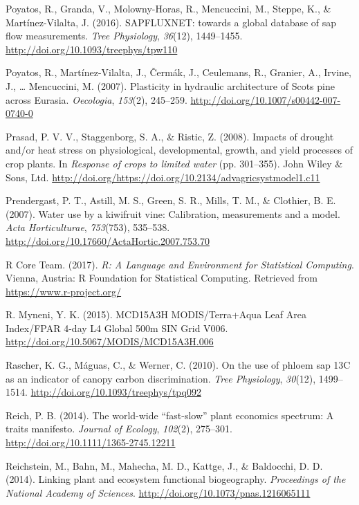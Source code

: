 \documentclass[11pt,twoside]{reedthesis}
\begin{document}
\hypertarget{ref-Poyatos2016}{}
Poyatos, R., Granda, V., Molowny-Horas, R., Mencuccini, M., Steppe, K.,
\& Martínez-Vilalta, J. (2016). SAPFLUXNET: towards a global database of
sap flow measurements. \emph{Tree Physiology}, \emph{36}(12),
1449--1455. \url{http://doi.org/10.1093/treephys/tpw110}

\hypertarget{ref-Poyatos2007}{}
Poyatos, R., Martínez-Vilalta, J., Čermák, J., Ceulemans, R., Granier,
A., Irvine, J., \ldots{} Mencuccini, M. (2007). Plasticity in hydraulic
architecture of Scots pine across Eurasia. \emph{Oecologia},
\emph{153}(2), 245--259. \url{http://doi.org/10.1007/s00442-007-0740-0}

\hypertarget{ref-Prasad2008}{}
Prasad, P. V. V., Staggenborg, S. A., \& Ristic, Z. (2008). Impacts of
drought and/or heat stress on physiological, developmental, growth, and
yield processes of crop plants. In \emph{Response of crops to limited
water} (pp. 301--355). John Wiley \& Sons, Ltd.
\url{http://doi.org/https://doi.org/10.2134/advagricsystmodel1.c11}

\hypertarget{ref-Prendergast2007}{}
Prendergast, P. T., Astill, M. S., Green, S. R., Mills, T. M., \&
Clothier, B. E. (2007). Water use by a kiwifruit vine: Calibration,
measurements and a model. \emph{Acta Horticulturae}, \emph{753}(753),
535--538. \url{http://doi.org/10.17660/ActaHortic.2007.753.70}

\hypertarget{ref-RCoreTeam2017}{}
R Core Team. (2017). \emph{R: A Language and Environment for Statistical
Computing}. Vienna, Austria: R Foundation for Statistical Computing.
Retrieved from \url{https://www.r-project.org/}

\hypertarget{ref-Myneni2015}{}
R. Myneni, Y. K. (2015). MCD15A3H MODIS/Terra+Aqua Leaf Area Index/FPAR
4-day L4 Global 500m SIN Grid V006.
\url{http://doi.org/10.5067/MODIS/MCD15A3H.006}

\hypertarget{ref-Rascher2010}{}
Rascher, K. G., Máguas, C., \& Werner, C. (2010). On the use of phloem
sap 13C as an indicator of canopy carbon discrimination. \emph{Tree
Physiology}, \emph{30}(12), 1499--1514.
\url{http://doi.org/10.1093/treephys/tpq092}

\hypertarget{ref-reich_world-wide_2014}{}
Reich, P. B. (2014). The world-wide ``fast-slow'' plant economics
spectrum: A traits manifesto. \emph{Journal of Ecology}, \emph{102}(2),
275--301. \url{http://doi.org/10.1111/1365-2745.12211}

\hypertarget{ref-Reichstein2014}{}
Reichstein, M., Bahn, M., Mahecha, M. D., Kattge, J., \& Baldocchi, D.
D. (2014). Linking plant and ecosystem functional biogeography.
\emph{Proceedings of the National Academy of Sciences}.
\url{http://doi.org/10.1073/pnas.1216065111}
\end{document}
